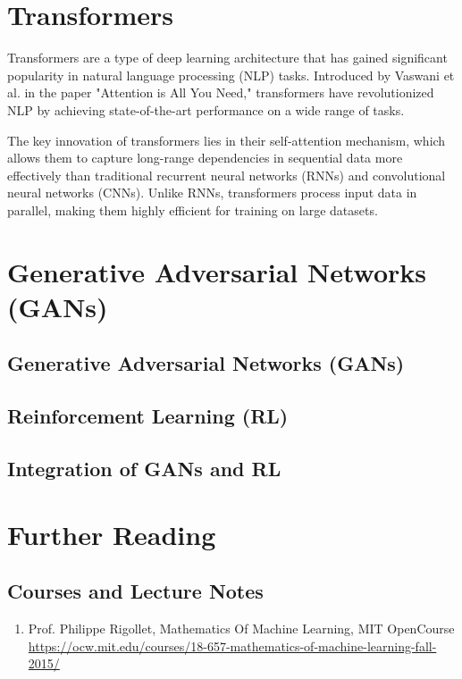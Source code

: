 \section{Transformers}\label{sec:transformers}

Transformers are a type of deep learning architecture that has gained significant popularity in natural language processing (NLP) tasks. Introduced by Vaswani et al. in the paper "Attention is All You Need," transformers have revolutionized NLP by achieving state-of-the-art performance on a wide range of tasks.

The key innovation of transformers lies in their self-attention mechanism, which allows them to capture long-range dependencies in sequential data more effectively than traditional recurrent neural networks (RNNs) and convolutional neural networks (CNNs). Unlike RNNs, transformers process input data in parallel, making them highly efficient for training on large datasets.

\section{Generative Adversarial Networks (GANs)}\label{sec:GAN} 
\subsection{Generative Adversarial Networks (GANs)}

\subsection{Reinforcement Learning (RL)}

\subsection{Integration of GANs and RL} 

\newpage



\section{Further Reading}

\subsection{Courses and Lecture Notes}
\begin{enumerate}[1] 
    \item Prof. Philippe Rigollet, Mathematics Of Machine Learning, MIT OpenCourse \url{https://ocw.mit.edu/courses/18-657-mathematics-of-machine-learning-fall-2015/}
\end{enumerate}

